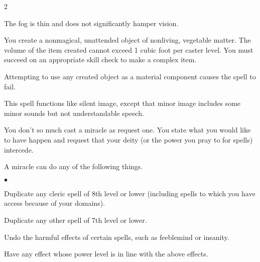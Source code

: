 \begin{multicols}{2}
\begin{small}
\smallskip\noindent The fog is thin and does not significantly hamper vision.

\noindent You create a nonmagical, unattended object of nonliving, vegetable matter. The volume of the item created cannot exceed 1 cubic foot per caster level. You must succeed on an appropriate skill check to make a complex item.

\smallskip\noindent Attempting to use any created object as a material component causes the spell to fail.


\noindent This spell functions like silent image, except that minor image includes some minor sounds but not understandable speech.

\noindent You don't so much cast a miracle as request one. You state what you would like to have happen and request that your deity (or the power you pray to for spells) intercede.

\smallskip\noindent A miracle can do any of the following things.

\begin{list}{$\bullet$}{\itemspace}
  \item Duplicate any cleric spell of 8th level or lower (including spells to which you have access because of your domains). 
  \item Duplicate any other spell of 7th level or lower.
  \item Undo the harmful effects of certain spells, such as feeblemind or insanity.
  \item Have any effect whose power level is in line with the above effects.
\end{list}
  

\end{small}
\end{multicols}
